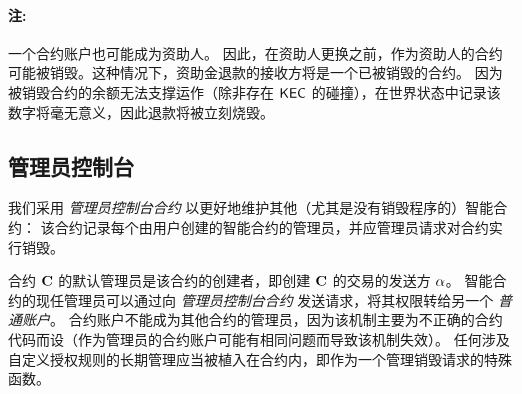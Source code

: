 \paragraph{注:} 一个合约账户也可能成为资助人。
因此，在资助人更换之前，作为资助人的合约可能被销毁。这种情况下，资助金退款的接收方将是一个已被销毁的合约。
因为被销毁合约的余额无法支撑运作（除非存在 $\mathsf{KEC}$ 的碰撞），在世界状态中记录该数字将毫无意义，因此退款将被立刻烧毁。


\subsection{管理员控制台}
\label{sec:admin}

我们采用 \emph{管理员控制台合约} 以更好地维护其他（尤其是没有销毁程序的）智能合约：
该合约记录每个由用户创建的智能合约的管理员，并应管理员请求对合约实行销毁。

合约 $\mathbf{C}$ 的默认管理员是该合约的创建者，即创建 $\mathbf{C}$ 的交易的发送方 $\mathbf{\alpha}$。
智能合约的现任管理员可以通过向 \emph{管理员控制台合约} 发送请求，将其权限转给另一个 \emph{普通账户}。
合约账户不能成为其他合约的管理员，因为该机制主要为不正确的合约代码而设（作为管理员的合约账户可能有相同问题而导致该机制失效）。
任何涉及自定义授权规则的长期管理应当被植入在合约内，即作为一个管理销毁请求的特殊函数。

